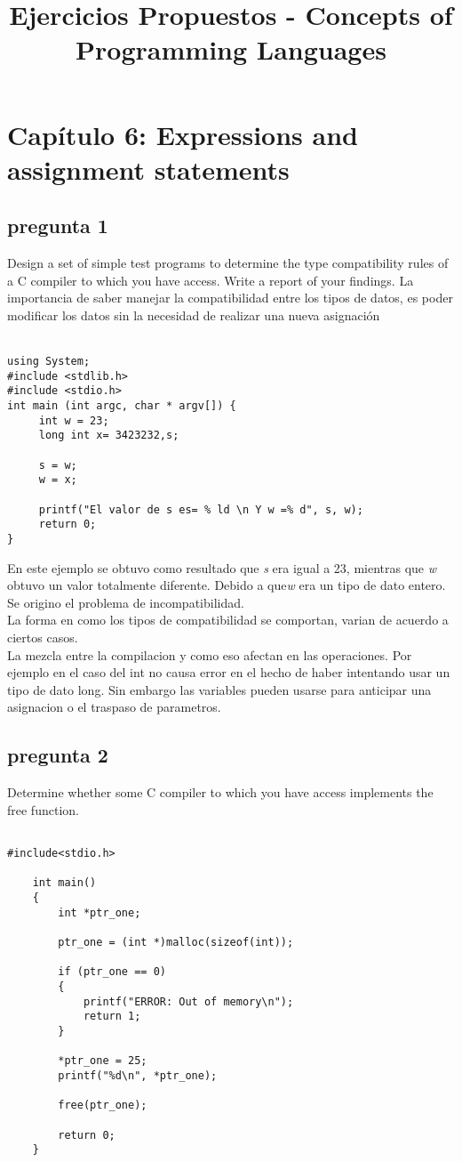 \documentclass[12pt,oneside]{article}
\title{Ejercicios Propuestos - Concepts of Programming Languages}
\author{}
\begin{document}
\maketitle

\section{Cap\'itulo 6: Expressions and assignment statements}

\subsection{pregunta 1}
Design a set of simple test programs to determine the type compatibility rules of a C compiler to which you have access. Write a report of your findings.
La importancia de saber manejar la compatibilidad entre los tipos de datos, es poder modificar los datos sin la necesidad de realizar una nueva asignaci\'on \\\
\begin{lstlisting}[frame=single] % Start your code-block
using System;
#include <stdlib.h>
#include <stdio.h>
int main (int argc, char * argv[]) {
     int w = 23;
     long int x= 3423232,s;

     s = w;
     w = x;

     printf("El valor de s es= % ld \n Y w =% d", s, w); 
     return 0;
} 

\end{lstlisting}

En este ejemplo se obtuvo como resultado que \textit{s} era igual a 23, mientras que \textit{w} obtuvo un valor totalmente diferente. Debido a que\textit{w} era un tipo de dato entero. Se origino el problema de incompatibilidad.\\
La forma en como los tipos de compatibilidad se comportan, varian de acuerdo a ciertos casos.\\
La mezcla entre la compilacion y como eso afectan en las operaciones. Por ejemplo en el caso del int no causa error en el hecho de haber intentando usar un tipo de dato long. Sin embargo las variables pueden usarse para anticipar una asignacion o el traspaso de parametros.\\


\subsection{pregunta 2}
Determine whether some C compiler to which you have access implements the free function.
\begin{lstlisting}[frame=single]

#include<stdio.h>

	int main()
	{
		int *ptr_one;

		ptr_one = (int *)malloc(sizeof(int));

		if (ptr_one == 0)
		{
			printf("ERROR: Out of memory\n");
			return 1;
		}

		*ptr_one = 25;
		printf("%d\n", *ptr_one);

		free(ptr_one);

		return 0;
	}
\end{lstlisting}
\end{document}
